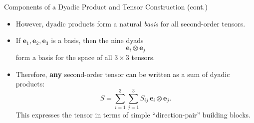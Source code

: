 \documentclass[aspectratio=169,11pt]{beamer}
\begin{document}
\begin{frame}{Components of a Dyadic Product and Tensor Construction (cont.)}

\begin{itemize}
    \item However, dyadic products form a natural \emph{basis} for all
          second-order tensors.

    \item If $\mathbf{e}_1,\mathbf{e}_2,\mathbf{e}_3$ is a basis, then the nine
          dyads
          \[
              \mathbf{e}_i \otimes \mathbf{e}_j
          \]
          form a basis for the space of all $3\times 3$ tensors.

    \item Therefore, \textbf{any} second-order tensor can be written as a sum of
          dyadic products:
          \[
              S = \sum_{i=1}^{3} \sum_{j=1}^{3} S_{ij}\,
                  \mathbf{e}_i \otimes \mathbf{e}_j.
          \]
          This expresses the tensor in terms of simple “direction-pair”
          building blocks.

\end{itemize}

\end{frame}
\end{document}
